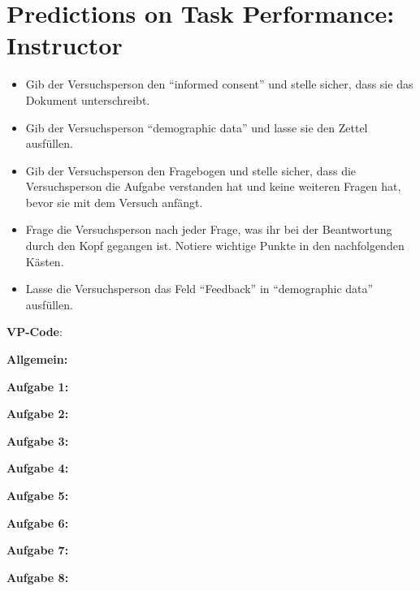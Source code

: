 \documentclass[color=9c]{tudaexercise}
\def\boxheight{1cm}
\begin{document}
\section*{Predictions on Task Performance: Instructor}

\begin{itemize}
	\item Gib der Versuchsperson den ``informed consent'' und stelle sicher, dass sie das Dokument unterschreibt.
	\item Gib der Versuchsperson ``demographic data'' und lasse sie den Zettel ausfüllen.
	\item Gib der Versuchsperson den Fragebogen und stelle sicher, dass die Versuchsperson die Aufgabe verstanden hat und keine weiteren Fragen hat, bevor sie mit dem Versuch anfängt.
	\item Frage die Versuchsperson nach jeder Frage, was ihr bei der Beantwortung durch den Kopf gegangen ist. Notiere wichtige Punkte in den nachfolgenden Kästen.
	\item Lasse die Versuchsperson das Feld ``Feedback'' in ``demographic data'' ausfüllen.
\end{itemize}

\vspace{2mm}

\textbf{VP-Code}: \fbox{\color{white}\rule{2cm}{2mm}\color{black}}

\vspace{3mm}

\noindent\textbf{Allgemein:}\\
\fbox{\color{white}\rule{.99\linewidth}{\boxheight}\color{black}}

\noindent\textbf{Aufgabe 1:}\\
\fbox{\color{white}\rule{.99\linewidth}{\boxheight}\color{black}}

\noindent\textbf{Aufgabe 2:}\\
\fbox{\color{white}\rule{.99\linewidth}{\boxheight}\color{black}}

\noindent\textbf{Aufgabe 3:}\\
\fbox{\color{white}\rule{.99\linewidth}{\boxheight}\color{black}}

\noindent\textbf{Aufgabe 4:}\\
\fbox{\color{white}\rule{.99\linewidth}{\boxheight}\color{black}}

\noindent\textbf{Aufgabe 5:}\\
\fbox{\color{white}\rule{.99\linewidth}{\boxheight}\color{black}}

\noindent\textbf{Aufgabe 6:}\\
\fbox{\color{white}\rule{.99\linewidth}{\boxheight}\color{black}}

\noindent\textbf{Aufgabe 7:}\\
\fbox{\color{white}\rule{.99\linewidth}{\boxheight}\color{black}}

\noindent\textbf{Aufgabe 8:}\\
\fbox{\color{white}\rule{.99\linewidth}{\boxheight}\color{black}}
\end{document}
